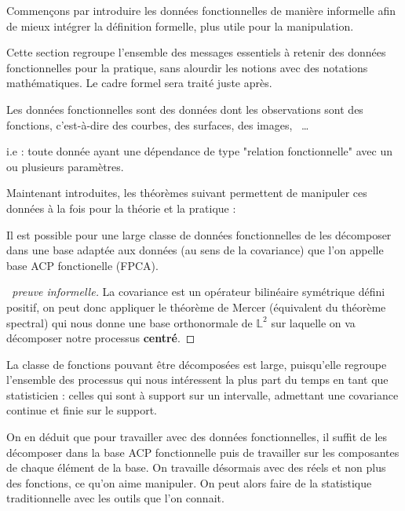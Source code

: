 
Commençons par introduire les données fonctionnelles de manière informelle afin de mieux intégrer la définition formelle, plus utile pour la manipulation.

Cette section regroupe l'ensemble des messages essentiels à retenir des données fonctionnelles pour la pratique, sans alourdir les notions avec des notations mathématiques. Le cadre formel sera traité juste après.

\begin{definition*}
    Les données fonctionnelles sont des données dont les observations sont des fonctions, c'est-à-dire des courbes, des surfaces, des images, \, \dots
    
    i.e : toute donnée ayant une dépendance de type "relation fonctionnelle" avec un ou plusieurs paramètres.
\end{definition*}

Maintenant introduites, les théorèmes suivant permettent de manipuler ces données à la fois pour la théorie et la pratique :

\begin{thm*}
    Il est possible pour une large classe de données fonctionnelles de les décomposer dans une base adaptée aux données (au sens de la covariance) que l'on appelle base ACP fonctionelle (FPCA).
\end{thm*}
\begin{proof}[\faCogs \, preuve informelle]
    La covariance est un opérateur bilinéaire symétrique défini positif, on peut donc appliquer le théorème de Mercer (équivalent du théorème spectral) qui nous donne une base orthonormale de $\mathds L^2$ sur laquelle on va décomposer notre processus \textbf{centré}.
\end{proof}
\begin{rem}
    La classe de fonctions pouvant être décomposées est large, puisqu'elle regroupe l'ensemble des processus qui nous intéressent la plus part du temps en tant que statisticien : celles qui sont à support sur un intervalle, admettant une covariance continue et finie sur le support.
\end{rem}
    
On en déduit que pour travailler avec des données fonctionnelles, il suffit de les décomposer dans la base ACP fonctionnelle puis de travailler sur les composantes de chaque élément de la base. On travaille désormais avec des réels et non plus des fonctions, ce qu'on aime manipuler. On peut alors faire de la statistique traditionnelle avec les outils que l'on connait.


